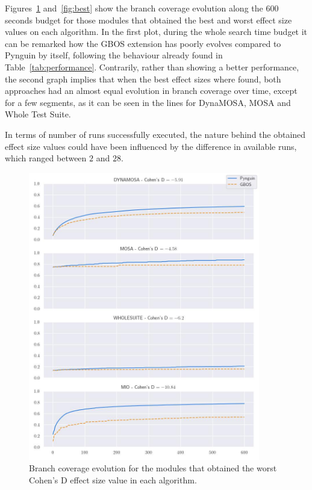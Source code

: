 \documentclass[%
  chapterprefix=false,%
  open=right,%
  twoside=true,%
  paper=a4,%
  logofile={Figures/logo.png},%
  thesistype=master,%
  UKenglish,%
]{se2thesis}
\begin{document}
Figures~\ref{fig:worst} and~\ref{fig:best} show the branch coverage evolution along the 600 seconds budget for those modules that obtained the best and worst effect size values on each algorithm.
In the first plot, during the whole search time budget it can be remarked how the GBOS extension has poorly evolves compared to Pynguin by itself, following the behaviour already found in Table~\ref{tab:performance}.
Contrarily, rather than showing a better performance, the second graph implies that when the best effect sizes where found, both approaches had an almost equal evolution in branch coverage over time, except for a few segments, as it can be seen in the lines for DynaMOSA, MOSA and Whole Test Suite.

In terms of number of runs successfully executed, the nature behind the obtained effect size values could have been influenced by the difference in available runs, which ranged between \(2\) and \(28\).


\begin{figure}[htb]
  \centering
  \includegraphics[width=0.9\textwidth]{Figures/Results/worstES.jpg}
  \caption{Branch coverage evolution for the modules that obtained the worst Cohen's D effect size value in each algorithm.}\label{fig:worst}
\end{figure}
\end{document}
